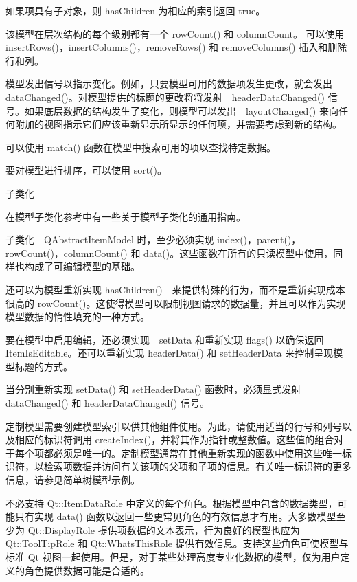 如果项具有子对象，则 hasChildren 为相应的索引返回 true。

该模型在层次结构的每个级别都有一个 rowCount() 和 columnCount。
可以使用 insertRows()，insertColumns()，removeRows() 和 removeColumns() 插入和删除行和列。

模型发出信号以指示变化。例如，只要模型可用的数据项发生更改，就会发出 dataChanged()。对模型提供的标题的更改将将发射　headerDataChanged() 信号。如果底层数据的结构发生了变化，则模型可以发出　layoutChanged() 来向任何附加的视图指示它们应该重新显示所显示的任何项，并需要考虑到新的结构。

可以使用 match() 函数在模型中搜索可用的项以查找特定数据。

要对模型进行排序，可以使用 sort()。

\splitLine

子类化

\begin{notice}
在模型子类化参考中有一些关于模型子类化的通用指南。
\end{notice}

子类化　QAbstractItemModel 时，至少必须实现 index()，parent()，rowCount()，columnCount() 和 data()。这些函数在所有的只读模型中使用，同样也构成了可编辑模型的基础。

还可以为模型重新实现 hasChildren()　来提供特殊的行为，而不是重新实现成本很高的 rowCount()。这使得模型可以限制视图请求的数据量，并且可以作为实现模型数据的惰性填充的一种方式。

要在模型中启用编辑，还必须实现　setData 和重新实现 flags() 以确保返回 ItemIsEditable。还可以重新实现 headerData() 和 setHeaderData 来控制呈现模型标题的方式。

当分别重新实现 setData() 和 setHeaderData() 函数时，必须显式发射　dataChanged() 和 headerDataChanged() 信号。

定制模型需要创建模型索引以供其他组件使用。为此，请使用适当的行号和列号以及相应的标识符调用 createIndex()，并将其作为指针或整数值。这些值的组合对于每个项都必须是唯一的。定制模型通常在其他重新实现的函数中使用这些唯一标识符，以检索项数据并访问有关该项的父项和子项的信息。有关唯一标识符的更多信息，请参见简单树模型示例。

不必支持 Qt::ItemDataRole 中定义的每个角色。根据模型中包含的数据类型，可能只有实现 data() 函数以返回一些更常见角色的有效信息才有用。大多数模型至少为 Qt::DisplayRole 提供项数据的文本表示，行为良好的模型也应为 Qt::ToolTipRole 和 Qt::WhatsThisRole 提供有效信息。支持这些角色可使模型与标准 Qt 视图一起使用。但是，对于某些处理高度专业化数据的模型，仅为用户定义的角色提供数据可能是合适的。

